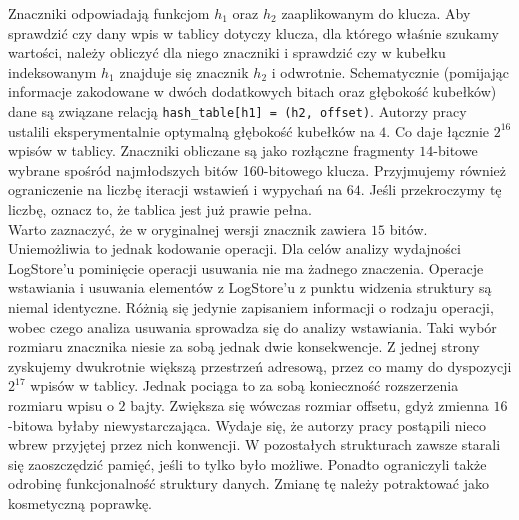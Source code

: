 \documentclass[declaration,shortabstract,masc]{iithesis}
\begin{document}
			\indent Znaczniki odpowiadają funkcjom $h_1$ oraz $h_2$ zaaplikowanym do klucza. Aby sprawdzić czy dany wpis w tablicy dotyczy klucza, dla którego właśnie szukamy wartości, należy obliczyć dla niego znaczniki i sprawdzić czy w kubełku indeksowanym $h_1$ znajduje się znacznik $h_2$ i odwrotnie. Schematycznie (pomijając informacje zakodowane w dwóch dodatkowych bitach oraz głębokość kubełków) dane są związane relacją \texttt{hash\_table[h1] = (h2, offset)}. Autorzy pracy \cite{SILT} ustalili eksperymentalnie optymalną głębokość kubełków na $4$. Co daje łącznie $2^{16}$ wpisów w tablicy. Znaczniki obliczane są jako rozłączne fragmenty $14$-bitowe wybrane spośród najmłodszych bitów 160-bitowego klucza. Przyjmujemy również ograniczenie na liczbę iteracji wstawień i wypychań na $64$. Jeśli przekroczymy tę liczbę, oznacz to, że tablica jest już prawie pełna.\\
			\indent Warto zaznaczyć, że w oryginalnej wersji znacznik zawiera $15$ bitów. Uniemożliwia to jednak kodowanie operacji. Dla celów analizy wydajności LogStore'u pominięcie operacji usuwania nie ma żadnego znaczenia. Operacje wstawiania i usuwania elementów z LogStore'u z punktu widzenia struktury są niemal identyczne. Różnią się jedynie zapisaniem informacji o rodzaju operacji, wobec czego analiza usuwania sprowadza się do analizy wstawiania. Taki wybór rozmiaru znacznika niesie za sobą jednak dwie konsekwencje. Z jednej strony zyskujemy dwukrotnie większą przestrzeń adresową, przez co mamy do dyspozycji $2^{17}$ wpisów w tablicy. Jednak pociąga to za sobą konieczność rozszerzenia rozmiaru wpisu o $2$ bajty. Zwiększa się wówczas rozmiar offsetu, gdyż zmienna $16$-bitowa byłaby niewystarczająca. Wydaje się, że autorzy pracy postąpili nieco wbrew przyjętej przez nich konwencji. W pozostałych strukturach zawsze starali się zaoszczędzić pamięć, jeśli to tylko było możliwe. Ponadto ograniczyli także odrobinę funkcjonalność struktury danych. Zmianę tę należy potraktować jako kosmetyczną poprawkę.\\
\end{document}
